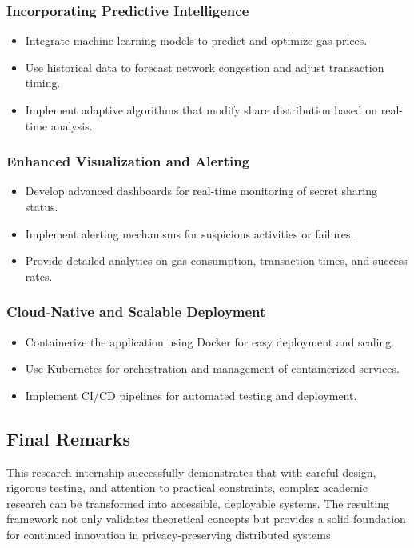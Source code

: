 \documentclass[12pt,a4paper]{article}
\begin{document}
\subsubsection{Incorporating Predictive Intelligence}

\begin{itemize}
    \item Integrate machine learning models to predict and optimize gas prices.
    \item Use historical data to forecast network congestion and adjust transaction timing.
    \item Implement adaptive algorithms that modify share distribution based on real-time analysis.
\end{itemize}

\subsubsection{Enhanced Visualization and Alerting}

\begin{itemize}
    \item Develop advanced dashboards for real-time monitoring of secret sharing status.
    \item Implement alerting mechanisms for suspicious activities or failures.
    \item Provide detailed analytics on gas consumption, transaction times, and success rates.
\end{itemize}

\subsubsection{Cloud-Native and Scalable Deployment}

\begin{itemize}
    \item Containerize the application using Docker for easy deployment and scaling.
    \item Use Kubernetes for orchestration and management of containerized services.
    \item Implement CI/CD pipelines for automated testing and deployment.
\end{itemize}

\subsection{Final Remarks}

This research internship successfully demonstrates that with careful design, rigorous testing, and attention to practical constraints, complex academic research can be transformed into accessible, deployable systems. The resulting framework not only validates theoretical concepts but provides a solid foundation for continued innovation in privacy-preserving distributed systems.
\end{document}
